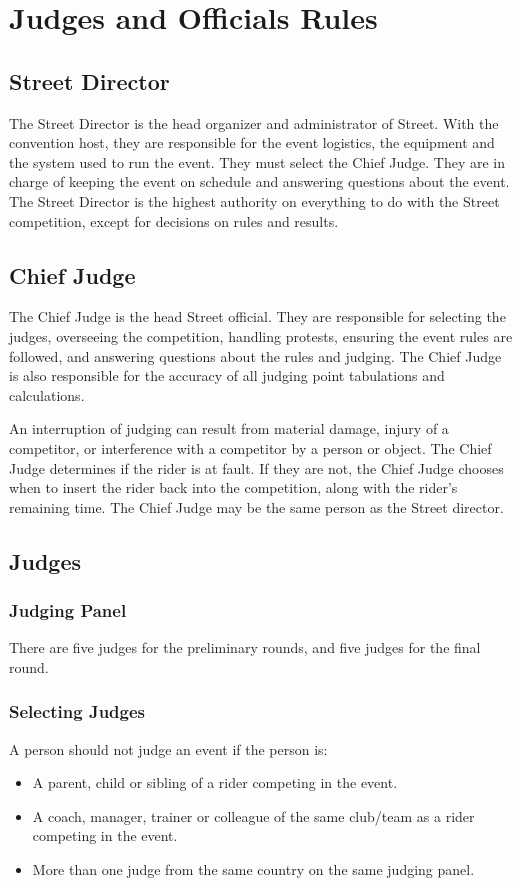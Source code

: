 \chapter{Judges and Officials Rules}

\section{Street Director}

The Street Director is the head organizer and administrator of Street.
With the convention host, they are responsible for the event logistics, the equipment and the system used to run the event.
They must select the Chief Judge.
They are in charge of keeping the event on schedule and answering questions about the event.
The Street Director is the highest authority on everything to do with the Street competition, except for decisions on rules and results.

\section{Chief Judge}

The Chief Judge is the head Street official.
They are responsible for selecting the judges, overseeing the competition, handling protests, ensuring the event rules are followed, and answering questions about the rules and judging.
The Chief Judge is also responsible for the accuracy of all judging point tabulations and calculations.

An interruption of judging can result from material damage, injury of a competitor, or interference with a competitor by a person or object.
The Chief Judge determines if the rider is at fault.
If they are not, the Chief Judge chooses when to insert the rider back into the competition, along with the rider's remaining time.
The Chief Judge may be the same person as the Street director.

\section{Judges}

\subsection{Judging Panel}

There are five judges for the preliminary rounds, and five judges for the final round.

\subsection{Selecting Judges}
A person should not judge an event if the person is:
\begin{itemize}
\item A parent, child or sibling of a rider competing in the event.
\item A coach, manager, trainer or colleague of the same club/team as a rider competing in the event.
\item More than one judge from the same country on the same judging panel.
\end{itemize}

